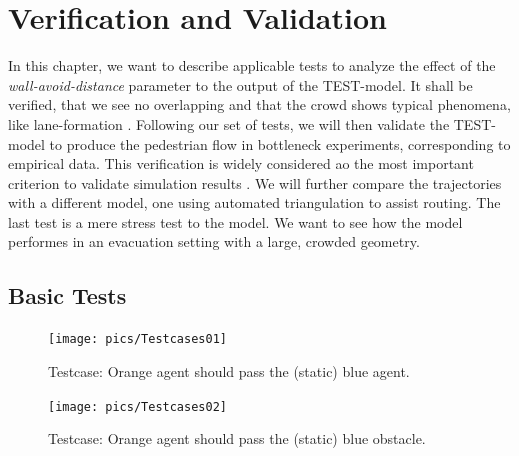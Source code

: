 \section{Verification and Validation}
In this chapter, we want to describe applicable tests to analyze the effect of the \emph{wall-avoid-distance} parameter to the output of the TEST-model. It shall be verified, that we see no overlapping and that the crowd shows typical phenomena, like lane-formation \citep{ZhangQ2011}. Following our set of tests, we will then validate the TEST-model to produce the pedestrian flow in bottleneck experiments, corresponding to empirical data. This verification is widely considered ao the most important criterion to validate simulation results \citep{Seyfried2008}.  We will further compare the trajectories with a different model, one using automated triangulation to assist routing. The last test is a mere stress test to the model. We want to see how the model performes in an evacuation setting with a large, crowded geometry.

\subsection{Basic Tests}




\begin{figure}[h!]
\texttt{[image: pics/Testcases01]}
\caption{Testcase: Orange agent should pass the (static) blue agent.}
\vspace{1cm}
\texttt{[image: pics/Testcases02]}
\caption{Testcase: Orange agent should pass the (static) blue obstacle.}
\label{test01}
\end{figure} 


